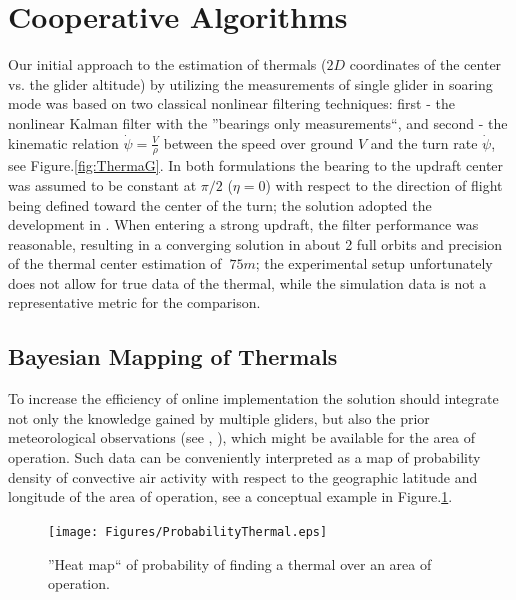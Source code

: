 \documentclass{ifacconf}
\begin{document}
\section{Cooperative Algorithms}
\label{sec:CoopAlgs}
Our initial approach to the estimation of thermals ($2D$ coordinates of the center vs. the glider altitude) by utilizing the measurements of single glider in soaring mode was based on two classical nonlinear filtering techniques: first - the nonlinear Kalman filter with the ''bearings only measurements``, and second - the kinematic relation $\dot{\psi}=\frac{V}{\rho}$ between the speed over ground $V$ and the turn rate $\dot{\psi}$, see Figure.\ref{fig:ThermaG}. In both formulations the bearing to the updraft center was assumed to be constant at $\pi/2$ ($\eta=0$)  with respect to the direction of flight being defined toward the center of the turn; the solution adopted the development in \cite{Dobrokhodov:2008}. When entering a strong updraft, the filter performance was reasonable, resulting in a converging solution in about 2 full orbits and precision of the thermal center estimation of $~75m$; the experimental setup unfortunately does not allow for true data of the thermal, while the simulation data is not a representative metric for the comparison.


\subsection{Bayesian Mapping of Thermals}
\label{subsec:BayesianMapping}
To increase the efficiency of online implementation the solution should integrate not only the knowledge gained by multiple gliders, but also the prior meteorological observations (see \cite{Pennycuick:1998}, \cite{Hindman:2007}), which might be available for the area of operation. Such data can be conveniently interpreted as a map of probability density of convective air activity with respect to the geographic latitude and longitude of the area of operation, see a conceptual example in Figure.\ref{fig:HeatMap}.

\begin{figure}[thpb]
  \centering
  \texttt{[image: Figures/ProbabilityThermal.eps]}
  \caption{''Heat map`` of probability of finding a thermal over an area of operation.}
  \label{fig:HeatMap}
\end{figure}
\end{document}
